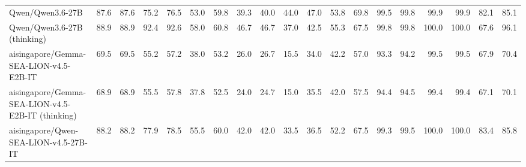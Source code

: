 \documentclass{article}
\begin{document}
\begin{table}[htbp]
\begin{threeparttable}
\begin{adjustbox}{max width=\textwidth}
\begin{tabular}{lrrrrrrrrrrrrrrrrrr}
Qwen/Qwen3.6-27B & \cellcolor[HTML]{A3CEE3}87.6 & \cellcolor[HTML]{A3CEE3}87.6 & \cellcolor[HTML]{C3DFEC}75.2 & \cellcolor[HTML]{C1DEEC}76.5 & \cellcolor[HTML]{F6FAFC}53.0 & \cellcolor[HTML]{EAF3F8}59.8 & \cellcolor[HTML]{D7EAF3}39.3 & \cellcolor[HTML]{D5E8F2}40.0 & \cellcolor[HTML]{A8D1E4}44.0 & \cellcolor[HTML]{B8D9E9}47.0 & \cellcolor[HTML]{B1D5E7}53.8 & \cellcolor[HTML]{97C8DF}69.8 & \cellcolor[HTML]{93C5DE}99.5 & \cellcolor[HTML]{92C5DE}99.8 & \cellcolor[HTML]{92C5DE}99.9 & \cellcolor[HTML]{92C5DE}99.9 & \cellcolor[HTML]{B3D6E8}82.1 & \cellcolor[HTML]{AED3E6}85.1 \\
Qwen/Qwen3.6-27B (thinking) & \cellcolor[HTML]{9DCAE1}88.9 & \cellcolor[HTML]{9DCAE1}88.9 & \cellcolor[HTML]{97C7DF}92.4 & \cellcolor[HTML]{96C7DF}92.6 & \cellcolor[HTML]{E4F0F6}58.0 & \cellcolor[HTML]{E5F1F7}60.8 & \cellcolor[HTML]{B6D8E9}46.7 & \cellcolor[HTML]{B6D8E9}46.7 & \cellcolor[HTML]{C9E2EE}37.0 & \cellcolor[HTML]{D5E8F2}42.5 & \cellcolor[HTML]{A9D1E5}55.3 & \cellcolor[HTML]{A3CEE3}67.5 & \cellcolor[HTML]{92C5DE}99.8 & \cellcolor[HTML]{92C5DE}99.8 & \cellcolor[HTML]{92C5DE}100.0 & \cellcolor[HTML]{92C5DE}100.0 & \cellcolor[HTML]{D7EAF3}67.6 & \cellcolor[HTML]{92C5DE}96.1 \\
aisingapore/Gemma-SEA-LION-v4.5-E2B-IT & \cellcolor[HTML]{FEFDFC}69.5 & \cellcolor[HTML]{FEFDFC}69.5 & \cellcolor[HTML]{F6FAFC}55.2 & \cellcolor[HTML]{F4F9FB}57.2 & \cellcolor[HTML]{FAD8C8}38.0 & \cellcolor[HTML]{FEF9F7}53.2 & \cellcolor[HTML]{FCEDE6}26.0 & \cellcolor[HTML]{FCEEE8}26.7 & \cellcolor[HTML]{FADACB}15.5 & \cellcolor[HTML]{FDF4F0}34.0 & \cellcolor[HTML]{EEF5F9}42.2 & \cellcolor[HTML]{D9EBF3}57.0 & \cellcolor[HTML]{A2CDE3}93.3 & \cellcolor[HTML]{A0CCE2}94.2 & \cellcolor[HTML]{93C5DE}99.5 & \cellcolor[HTML]{93C5DE}99.5 & \cellcolor[HTML]{D7E9F2}67.9 & \cellcolor[HTML]{D2E7F1}70.4 \\
aisingapore/Gemma-SEA-LION-v4.5-E2B-IT (thinking) & \cellcolor[HTML]{FEFBF9}68.9 & \cellcolor[HTML]{FEFAF9}68.9 & \cellcolor[HTML]{F5FAFC}55.5 & \cellcolor[HTML]{F2F8FB}57.8 & \cellcolor[HTML]{FAD7C7}37.8 & \cellcolor[HTML]{FEF7F4}52.5 & \cellcolor[HTML]{FBE6DC}24.0 & \cellcolor[HTML]{FCE6DD}24.7 & \cellcolor[HTML]{FAD8C9}15.0 & \cellcolor[HTML]{FEFCFB}35.5 & \cellcolor[HTML]{EEF6FA}42.0 & \cellcolor[HTML]{D7E9F2}57.5 & \cellcolor[HTML]{A0CCE2}94.4 & \cellcolor[HTML]{A0CCE2}94.5 & \cellcolor[HTML]{93C5DE}99.4 & \cellcolor[HTML]{93C5DE}99.4 & \cellcolor[HTML]{D9EAF3}67.1 & \cellcolor[HTML]{D3E7F1}70.1 \\
aisingapore/Qwen-SEA-LION-v4.5-27B-IT & \cellcolor[HTML]{A0CCE2}88.2 & \cellcolor[HTML]{A0CCE2}88.2 & \cellcolor[HTML]{BCDBEA}77.9 & \cellcolor[HTML]{BCDBEA}78.5 & \cellcolor[HTML]{EDF5F9}55.5 & \cellcolor[HTML]{E8F3F8}60.0 & \cellcolor[HTML]{CBE3EF}42.0 & \cellcolor[HTML]{CCE4EF}42.0 & \cellcolor[HTML]{D9EAF3}33.5 & \cellcolor[HTML]{FBFDFE}36.5 & \cellcolor[HTML]{B9DAEA}52.2 & \cellcolor[HTML]{A3CEE3}67.5 & \cellcolor[HTML]{93C5DE}99.3 & \cellcolor[HTML]{93C5DE}99.5 & \cellcolor[HTML]{92C5DE}100.0 & \cellcolor[HTML]{92C5DE}100.0 & \cellcolor[HTML]{B0D5E7}83.4 & \cellcolor[HTML]{ACD3E6}85.8 \\

\end{tabular}
\end{adjustbox}
\end{threeparttable}
\end{table}
\end{document}
